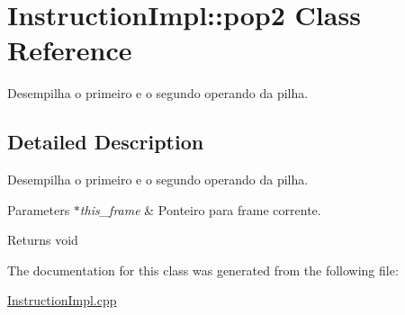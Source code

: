 \hypertarget{class_instruction_impl_1_1pop2}{}\section{Instruction\+Impl\+:\+:pop2 Class Reference}
\label{class_instruction_impl_1_1pop2}


Desempilha o primeiro e o segundo operando da pilha.  




\subsection{Detailed Description}
Desempilha o primeiro e o segundo operando da pilha. 


\begin{DoxyParams}{Parameters}
{\em $\ast$this\+\_\+frame} & Ponteiro para frame corrente. \\
\hline
\end{DoxyParams}
\begin{DoxyReturn}{Returns}
void 
\end{DoxyReturn}


The documentation for this class was generated from the following file\+:\begin{DoxyCompactItemize}
\item 
\hyperlink{_instruction_impl_8cpp}{Instruction\+Impl.\+cpp}\end{DoxyCompactItemize}
